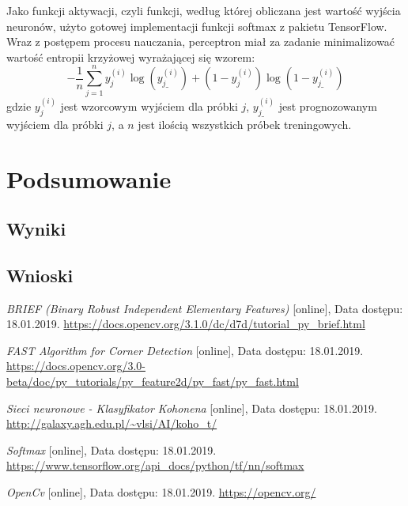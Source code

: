 \documentclass[12pt, notitlepage]{article}
\begin{document}
Jako funkcji aktywacji, czyli funkcji, według której obliczana jest wartość wyjścia neuronów, użyto gotowej implementacji funkcji softmax\cite{softmax} z pakietu TensorFlow. Wraz z postępem procesu nauczania, perceptron miał za zadanie minimalizować wartość entropii krzyżowej wyrażającej się wzorem: $$-\frac{1}{n}\sum_{j=1}^{n}y_j^{(i)}\log(y_{j\_}^{(i)}) + (1  - y_j^{(i)})\log(1 - y_{j\_}^{(i)})$$
gdzie $y_j^{(i)}$ jest wzorcowym wyjściem dla próbki $j$, $y_{j\_}^{(i)}$ jest prognozowanym wyjściem dla próbki $j$, a $n$ jest ilością wszystkich próbek treningowych.

\section{Podsumowanie}

\subsection{Wyniki}

\subsection{Wnioski}

\newpage

\begin{thebibliography}{9}

\textit{BRIEF (Binary Robust Independent Elementary Features) } [online], Data dostępu: 18.01.2019. 
\newline\url{https://docs.opencv.org/3.1.0/dc/d7d/tutorial_py_brief.html}

\textit{FAST Algorithm for Corner Detection} [online], Data dostępu: 18.01.2019. 
\newline\url{https://docs.opencv.org/3.0-beta/doc/py_tutorials/py_feature2d/py_fast/py_fast.html}

\textit{Sieci neuronowe - Klasyfikator Kohonena} [online], Data dostępu: 18.01.2019. 
\newline\url{http://galaxy.agh.edu.pl/~vlsi/AI/koho_t/}

\textit{Softmax} [online], Data dostępu: 18.01.2019. 
\newline\url{https://www.tensorflow.org/api_docs/python/tf/nn/softmax}

\textit{OpenCv} [online], Data dostępu: 18.01.2019. 
\newline\url{https://opencv.org/}

\end{thebibliography} 





\end{document}
